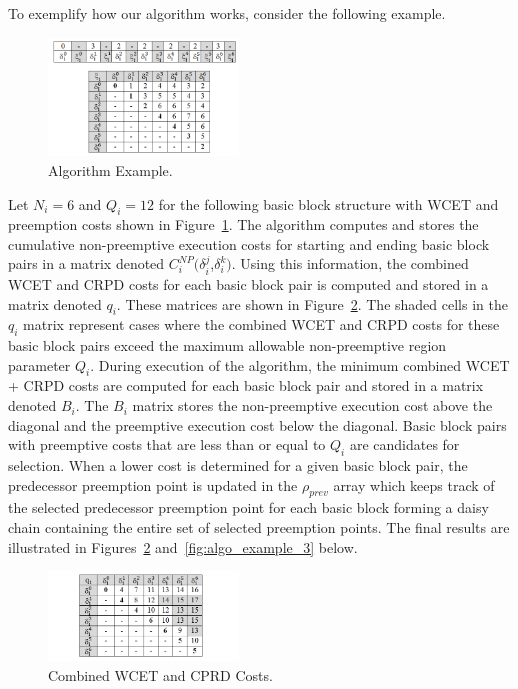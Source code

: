 To exemplify how our algorithm works, consider the following example.
\begin{figure}[h!]
\vspace{-5pt}
\begin{center}
\includegraphics[width=0.45\textwidth]{algo_example.png}
\caption{Algorithm Example.}
\label{fig:algo_example}
\end{center}
\vspace{-10pt}
\end{figure}
Let $N_i=6$ and $Q_i=12$ for the following basic block structure with WCET and preemption costs shown in Figure~\ref{fig:algo_example}.  The algorithm computes and stores the cumulative non-preemptive execution costs for starting and ending basic block pairs in a matrix denoted $C_{i}^{NP}(\delta_{i}^{j}$,$\delta_{i}^{k})$.  Using this information, the combined WCET and CRPD costs for each basic block pair is computed and stored in a matrix denoted $q_{i}$.  These matrices are shown in Figure~\ref{fig:algo_example_2}.  The shaded cells in the $q_{i}$ matrix represent cases where the combined WCET and CRPD costs for these basic block pairs exceed the maximum allowable non-preemptive region parameter $Q_i$.  During execution of the algorithm, the minimum combined WCET + CRPD costs are computed for each basic block pair and stored in a matrix denoted $B_{i}$.  The $B_{i}$ matrix stores the non-preemptive execution cost above the diagonal and the preemptive execution cost below the diagonal.  Basic block pairs with preemptive costs that are less than or equal to $Q_i$ are candidates for selection.  When a lower cost is determined for a given basic block pair, the predecessor preemption point is updated in the $\rho_{prev}$ array which keeps track of the selected predecessor preemption point for each basic block forming a daisy chain containing the entire set of selected preemption points.  The final results are illustrated in Figures~\ref{fig:algo_example_2} and~\ref{fig:algo_example_3} below.
\begin{figure}[h!]
\vspace{-5pt}
\begin{center}
\includegraphics[width=0.45\textwidth]{algo_example_2.png}
\caption{Combined WCET and CPRD Costs.}
\label{fig:algo_example_2}
\end{center}
\vspace{-10pt}
\end{figure}
